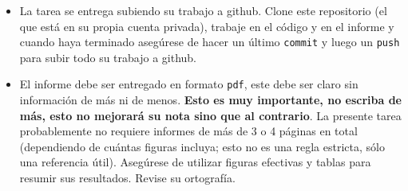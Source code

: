 \documentclass[letter, 11pt]{article}
\begin{document}
\begin{itemize}
\item La tarea se entrega subiendo su trabajo a github. Clone este repositorio
  (el que está en su propia cuenta privada), trabaje en el código y en el
  informe y cuando haya terminado asegúrese de hacer un último \texttt{commit}
  y luego un \texttt{push} para subir todo su trabajo a github.

\item El informe debe ser entregado en formato \texttt{pdf}, este debe ser
  claro sin información de más ni de menos. \textbf{Esto es muy importante, no
  escriba de más, esto no mejorará su nota sino que al contrario}. La presente
  tarea probablemente no requiere informes de más de 3 o 4 páginas en total
  (dependiendo de cuántas figuras incluya; esto no es una regla estricta, sólo
  una referencia útil).  Asegúrese de utilizar figuras efectivas y tablas para
  resumir sus resultados. Revise su ortografía.

\end{itemize}

\end{document}
